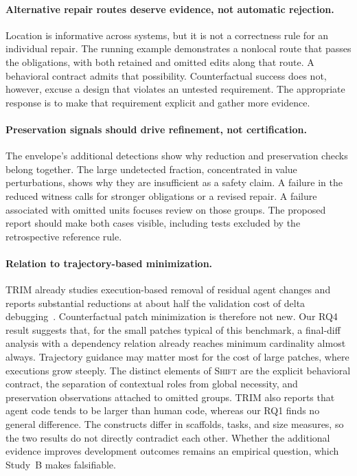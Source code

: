 \documentclass[a4paper,fleqn]{cas-sc}
\newcommand{\tool}{\textsc{Shift}}
\begin{document}
\paragraph{Alternative repair routes deserve evidence, not automatic rejection.}
Location is informative across systems, but it is not a correctness rule for an individual repair. The running example demonstrates a nonlocal route that passes the obligations, with both retained and omitted edits along that route. A behavioral contract admits that possibility. Counterfactual success does not, however, excuse a design that violates an untested requirement. The appropriate response is to make that requirement explicit and gather more evidence.

\paragraph{Preservation signals should drive refinement, not certification.}
The envelope's additional detections show why reduction and preservation checks belong together. The large undetected fraction, concentrated in value perturbations, shows why they are insufficient as a safety claim. A failure in the reduced witness calls for stronger obligations or a revised repair. A failure associated with omitted units focuses review on those groups. The proposed report should make both cases visible, including tests excluded by the retrospective reference rule.

\paragraph{Relation to trajectory-based minimization.}
TRIM already studies execution-based removal of residual agent changes and reports substantial reductions at about half the validation cost of delta debugging~\citep{mathai2026trim}. Counterfactual patch minimization is therefore not new. Our RQ4 result suggests that, for the small patches typical of this benchmark, a final-diff analysis with a dependency relation already reaches minimum cardinality almost always. Trajectory guidance may matter most for the cost of large patches, where executions grow steeply. The distinct elements of \tool{} are the explicit behavioral contract, the separation of contextual roles from global necessity, and preservation observations attached to omitted groups. TRIM also reports that agent code tends to be larger than human code, whereas our RQ1 finds no general difference. The constructs differ in scaffolds, tasks, and size measures, so the two results do not directly contradict each other. Whether the additional evidence improves development outcomes remains an empirical question, which Study~B makes falsifiable.
\end{document}
